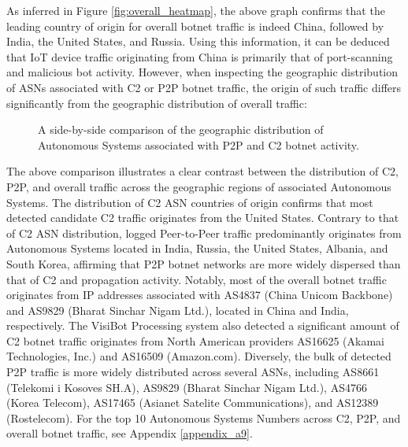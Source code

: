 As inferred in Figure \ref{fig:overall_heatmap}, the above graph confirms that the leading country of origin for overall botnet traffic is indeed China, followed by India, the United States, and Russia. Using this information, it can be deduced that IoT device traffic originating from China is primarily that of port-scanning and malicious bot activity. However, when inspecting the geographic distribution of ASNs associated with C2 or P2P botnet traffic, the origin of such traffic differs significantly from the geographic distribution of overall traffic:

\begin{figure}[!htb]
    \centering
    \qquad
    \caption{A side-by-side comparison of the geographic distribution of Autonomous Systems associated with P2P and C2 botnet activity.}
    \label{fig:p2p_c2_asn_dist}
\end{figure}

The above comparison illustrates a clear contrast between the distribution of C2, P2P, and overall traffic across the geographic regions of associated Autonomous Systems. The distribution of C2 ASN countries of origin confirms that most detected candidate C2 traffic originates from the United States. Contrary to that of C2 ASN distribution, logged Peer-to-Peer traffic predominantly originates from Autonomous Systems located in India, Russia, the United States, Albania, and South Korea, affirming that P2P botnet networks are more widely dispersed than that of C2 and propagation activity. Notably, most of the overall botnet traffic originates from IP addresses associated with AS4837 (China Unicom Backbone) and AS9829 (Bharat Sinchar Nigam Ltd.), located in China and India, respectively. The VisiBot Processing system also detected a significant amount of C2 botnet traffic originates from North American providers AS16625 (Akamai Technologies, Inc.) and AS16509 (Amazon.com). Diversely, the bulk of detected P2P traffic is more widely distributed across several ASNs, including AS8661 (Telekomi i Kosoves SH.A), AS9829 (Bharat Sinchar Nigam Ltd.), AS4766 (Korea Telecom), AS17465 (Asianet Satelite Communications), and AS12389 (Rostelecom). For the top 10 Autonomous Systems Numbers across C2, P2P, and overall botnet traffic, see Appendix \ref{appendix_a9}. 


